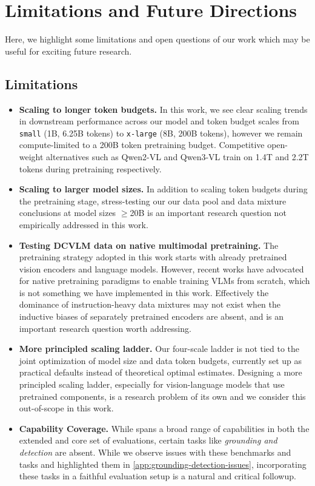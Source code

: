 
\clearpage

\section{Limitations and Future Directions}\label{app:future-directions}
Here, we highlight some limitations and open questions of our work which may be useful for exciting future research. 
\subsection{Limitations}\label{appsub:limitations}
\begin{itemize}
    \item \textbf{Scaling to longer token budgets.} In this work, we see clear scaling trends in downstream performance across our model and token budget scales from \texttt{small} (1B, 6.25B tokens) to \texttt{x-large} (8B, 200B tokens), however we remain compute-limited to  a 200B token pretraining budget. Competitive open-weight alternatives such as Qwen2-VL and Qwen3-VL train on 1.4T and 2.2T tokens during pretraining respectively.  
    \item \textbf{Scaling to larger model sizes.} In addition to scaling token budgets during the pretraining stage, stress-testing our our data pool and data mixture conclusions at model sizes $\geq$20B is an important research question not empirically addressed in this work.
    \item \textbf{Testing DCVLM data on native multimodal pretraining.} The pretraining strategy adopted in this work starts with already pretrained vision encoders and language models. However, recent works have advocated for native pretraining paradigms to enable training VLMs from scratch, which is not something we have implemented in this work. Effectively the dominance of instruction-heavy data mixtures may not exist when the inductive biases of separately pretrained encoders are absent, and is an important research question worth addressing.
    \item \textbf{More principled scaling ladder. } Our four-scale ladder is not tied to the joint optimization of model size and data token budgets, currently set up as practical defaults instead of theoretical optimal estimates. Designing a more principled scaling ladder, especially for vision-language models that use pretrained components, is a research problem of its own and we consider this out-of-scope in this work. 
    \item \textbf{Capability Coverage.} While \dcvlm{} spans a broad range of capabilities in both the extended and core set of evaluations, certain tasks like \emph{grounding and detection} are absent. While we observe issues with these benchmarks and tasks and highlighted them in \cref{app:grounding-detection-issues}, incorporating these tasks in a faithful evaluation setup is a natural and critical followup.

\end{itemize}

